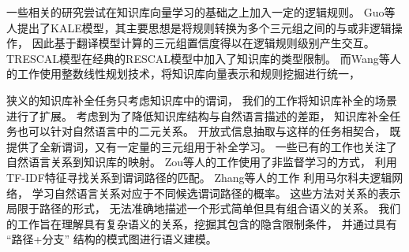 
一些相关的研究尝试在知识库向量学习的基础之上加入一定的逻辑规则。
Guo等人提出了KALE模型\cite{guo2016jointly}，其主要思想是将规则转换为多个三元组之间的与或非逻辑操作，
因此基于翻译模型计算的三元组置信度得以在逻辑规则级别产生交互。
TRESCAL模型\cite{chang2014typed}在经典的RESCAL模型中加入了知识库的类型限制。
而Wang等人的工作\cite{wang2015knowledge}使用整数线性规划技术，将知识库向量表示和规则挖掘进行统一，


狭义的知识库补全任务只考虑知识库中的谓词，
我们的工作将知识库补全的场景进行了扩展。
考虑到为了降低知识库结构与自然语言描述的差距，
知识库补全任务也可以针对自然语言中的二元关系。
开放式信息抽取与这样的任务相契合，
既提供了全新谓词，又有一定量的三元组用于补全学习。
一些已有的工作也关注了自然语言关系到知识库的映射。
Zou等人的工作\cite{zou2014natural}使用了非监督学习的方式，
利用TF-IDF特征寻找关系到谓词路径的匹配。
Zhang等人的工作\cite{zhang2012ontological}
利用马尔科夫逻辑网络\cite{richardson2006markov}，
学习自然语言关系对应于不同候选谓词路径的概率。
这些方法对关系的表示局限于路径的形式，
无法准确地描述一个形式简单但具有组合语义的关系。
我们的工作旨在理解具有复杂语义的关系，挖掘其包含的隐含限制条件，
并通过具有 ``{路径+分支}'' 结构的模式图进行语义建模。


